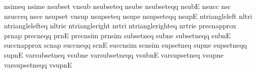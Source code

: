 nsimeq                 nsime
 nsubset                vnsub
 nsubseteq              nsube
 nsubseteqq             nsubE
 nsucc                  nsc
 nsucceq                nsce
 nsupset                vnsup
 nsupseteq              nsupe
 nsupseteqq             nsupE
 ntriangleleft          nltri
 ntrianglelefteq        nltrie
 ntriangleright         nrtri
 ntrianglerighteq       nrtrie
 precnapprox            prnap
 precneqq               prnE
 precnsim               prnsim
 subsetneq              subne
 subsetneqq             subnE
 succnapprox            scnap
 succneqq               scnE
 succnsim               scnsim
 supsetneq              supne
 supsetneqq             supnE
 varsubsetneq           vsubne
 varsubsetneqq          vsubnE
 varsupsetneq           vsupne
 varsupsetneqq          vsupnE
